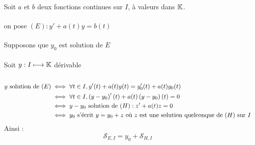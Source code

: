 \begin{dem}
    Soit \(a \) et \(b\) deux fonctions continues sur \(I\), à valeurs dans \(\mathbb{K}\).\\~\\
    on pose \((E) : y' + a(t)y = b(t)\)\\~\\
    Supposons que \(y_0\) est solution de \(E\)\\~\\
    Soit \(y : I \longmapsto \mathbb{K}\) dérivable\\~\\
    \begin{align*}
        y \text{ solution de } (E) & \iff \forall t \in I,y'(t) + a(t) y(t) = y_0'(t) + a(t) y_0(t) \\
        &\iff \forall t \in I,\left(y-y_0\right)'(t) + a(t)\left(y-y_0\right)(t) = 0\\
        &\iff y-y_0 \text{ solution de } (H):z' + a(t)z = 0 \\
        &\iff y_0 \text{ s'écrit } y = y_0 +z \text{ où } z \text{ est une solution quelconque de } (H) \text{ sur } I
    \end{align*}
    Ainsi : 
    \[\mathcal{S}_{E,I} = y_0+\mathcal{S}_{H,I}\]
\end{dem}

